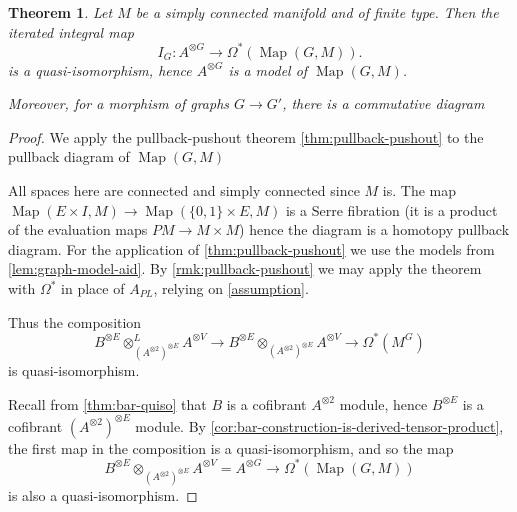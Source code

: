 \documentclass{scrartcl}
\theoremstyle{plain}
\newtheorem{theorem}{Theorem}[section]
\theoremstyle{definition}
\newcommand{\APL}{A_{PL}}
\DeclareMathOperator{\Map}{Map}
\begin{document}
\begin{theorem}\label{thm:graph-mapping-space}
    Let $M$ be a simply connected manifold and of finite type. Then the iterated integral map 
    $$I_G\colon A^{\otimes G} \to \Omega^*(\Map(G, M)).$$
    is a quasi-isomorphism, hence $A^ {\otimes G}$ is a model of $\Map(G, M)$.

    Moreover, for a morphism of graphs $G\to G'$, there is a commutative diagram
    \begin{center}
    \end{center}
\end{theorem}
\begin{proof}
    We apply the pullback-pushout theorem \ref{thm:pullback-pushout} to the pullback diagram of $\Map(G, M)$
    \begin{center}
    \end{center}
    All spaces here are connected and simply connected since $M$ is. The map $\Map(E\times I, M)\to\Map(\{0,1\}\times E, M)$ is a Serre fibration (it is a product of the evaluation maps $PM\to M\times M$) hence the diagram is a homotopy pullback diagram. 
    For the application of \cref{thm:pullback-pushout} we use the models from \cref{lem:graph-model-aid}. By \cref{rmk:pullback-pushout} we may apply the theorem with $\Omega^*$ in place of $\APL$, relying on \cref{assumption}. 

    Thus the composition $$B^{\otimes E}\otimes^L_{(A^{\otimes 2})^{\otimes E}} A^{\otimes V} \to B^{\otimes E}\otimes_{(A^{\otimes 2})^{\otimes E}} A^{\otimes V} \to \Omega^*(M^G)$$ is quasi-isomorphism. 

    Recall from \cref{thm:bar-quiso} that $B$ is a cofibrant $A^{\otimes 2}$ module, hence $B^{\otimes E}$ is a cofibrant $(A^{\otimes 2})^{\otimes E}$ module. By \cref{cor:bar-construction-is-derived-tensor-product}, the first map in the composition is a quasi-isomorphism, and so the map $$B^{\otimes E}\otimes_{(A^{\otimes 2})^{\otimes E}} A^{\otimes V} = A^{\otimes G}\to \Omega^*(\Map(G, M))$$
    is also a quasi-isomorphism.
\end{proof}
\end{document}
